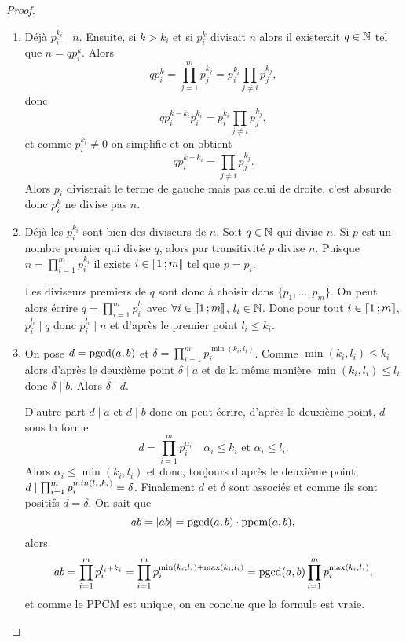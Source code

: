 \begin{proof}
  \begin{enumerate}
  \item Déjà $p_i^{k_i} \mid n$. Ensuite, si $k > k_i$ et si $p_i^k$ divisait $n$ alors il existerait $q \in \mathbb{N}$ tel que $n=q p_i^k$. Alors
    \begin{equation}
      qp_i^k = \prod_{j=1}^m p_j^{k_j} = p_i^{k_i} \prod_{j \neq i} p_j^{k_j},
    \end{equation}
    donc
    \begin{equation}
      qp_i^{k-k_i}p_i^{k_i} =  p_i^{k_i} \prod_{j \neq i} p_j^{k_j},
    \end{equation}
    et comme $p_i^{k_i} \neq 0$ on simplifie et on obtient
    \begin{equation}
      qp_i^{k-k_i} = \prod_{j \neq i} p_j^{k_j}.
    \end{equation}
    Alors $p_i$ diviserait le terme de gauche mais pas celui de droite, c'est absurde donc $p_i^k$ ne divise pas $n$.
  \item Déjà les $p_i^{k_i}$ sont bien des diviseurs de $n$. Soit $q \in \mathbb{N}$ qui divise $n$. Si $p$ est un nombre premier qui divise $q$, alors par transitivité $p$ divise $n$. Puisque $n=\prod_{i=1}^m p_i^{k_i}$ il existe $i \in \mathopen{\llbracket}1\mathclose{}\mathpunct{};m\mathclose{\rrbracket}$ tel que $p=p_i$.

    Les diviseurs premiers de $q$ sont donc à choisir dans $\{p_1, \ldots, p_m\}$. On peut alors écrire $q=\prod_{i=1}^m p_i^{l_i}$ avec $\forall i \in \mathopen{\llbracket}1\mathclose{}\mathpunct{};m\mathclose{\rrbracket}$, $l_i \in \mathbb{N}$. Donc pour tout $i\in \mathopen{\llbracket}1\mathclose{}\mathpunct{};m\mathclose{\rrbracket}$, $p_i^{l_i} \mid q$ donc $p_i^{l_i} \mid n$ et d'après le premier point $l_i \leqslant k_i$.
  \item On pose $d= \operatorname{pgcd}(a,b)$ et $\delta = \prod_{i=1}^m p_i^{\min(k_i,l_i)}$. Comme $\min(k_i, l_i) \leqslant k_i$ alors d'après le deuxième point $\delta \mid a$ et de la même manière $\min(k_i, l_i) \leqslant l_i$ donc $\delta \mid b$. Alors $\delta \mid d$.

    D'autre part $d \mid a$ et $d \mid b$ donc on peut écrire, d'après le deuxième point, $d$ sous la forme
    \begin{equation}
      d = \prod_{i=1}^m p_i^{\alpha_i} \quad \alpha_i \leqslant k_i \text{~et~} \alpha_i \leqslant l_i.
    \end{equation}
    Alors $\alpha_i \leqslant \min(k_i,l_i)$ et donc, toujours d'après le deuxième point, $d \mid \prod_{i=1}^m p_i ^{\\min(l_i,k_i)}=\delta$. Finalement $d$ et $\delta$ sont associés et comme ils sont positifs $d=\delta$. On sait que
    \begin{equation}
      ab=\left\lvert ab\right\rvert = \operatorname{pgcd}(a,b) \cdot \operatorname{ppcm}(a,b),
    \end{equation}
    alors
    \begin{equation}
      ab = \prod_{i=1}^m p_i^{l_i+k_i}= \prod_{i=1}^m p_i^{\min(k_i,l_i)+\max(k_i,l_i)} = \operatorname{pgcd}(a,b) \prod_{i=1}^m p_i^{\max(k_i,l_i)},
    \end{equation}
    et comme le PPCM est unique, on en conclue que la formule est vraie.
  \end{enumerate}
\end{proof}

